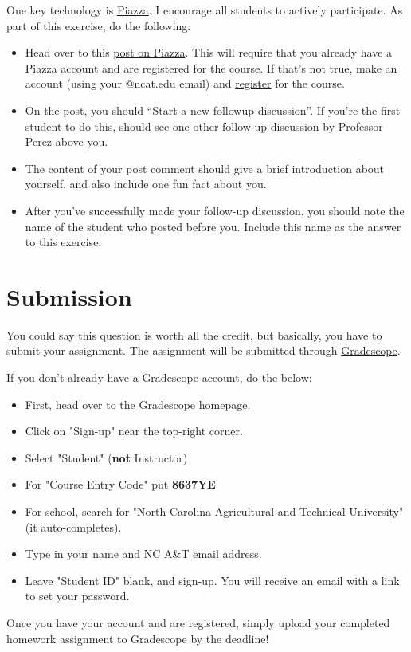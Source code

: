 \documentclass [12pt]{article}
\begin{document}
One key technology is \href{https://piazza.com/north_carolina_at_state_university/spring2022/comp285/home}{Piazza}. I encourage all students to actively participate. As part of this exercise, do the following:

\begin{itemize}
    \item Head over to this \href{https://piazza.com/class/kx9c6qsst5i7mo?cid=10}{post on Piazza}. This will require that you already have a Piazza account and are registered for the course. If that's not true, make an account (using your @ncat.edu email) and  \href{https://piazza.com/north_carolina_at_state_university/spring2022/comp285}{register} for the course.
    \item On the post, you should ``Start a new followup discussion''. If you're the first student to do this, should see one other follow-up discussion by Professor Perez above you. 
    \item The content of your post comment should give a brief introduction about yourself, and also include one fun fact about you.
    \item After you've successfully made your follow-up discussion, you should note the name of the student who posted before you. Include this name as the answer to this exercise.
\end{itemize}



\section{Submission}

You could say this question is worth all the credit, but basically, you have to submit your assignment. The assignment will be submitted through \href{https://www.gradescope.com/courses/350304}{Gradescope}. 

If you don't already have a Gradescope account, do the below:
\begin{itemize}
    \item First, head over to the \href{https://gradescope.com}{Gradescope homepage}. 
    \item Click on "Sign-up" near the top-right corner.
    \item Select "Student" (\textbf{not} Instructor)
    \item For "Course Entry Code" put \textbf{8637YE}
    \item For school, search for "North Carolina Agricultural and Technical University" (it auto-completes).
    \item Type in your name and NC A\&T email address.
    \item Leave "Student ID" blank, and sign-up. You will receive an email with a link to set your password.
\end{itemize}

Once you have your account and are registered, simply upload your completed homework assignment to Gradescope by the deadline!
\end{document}
